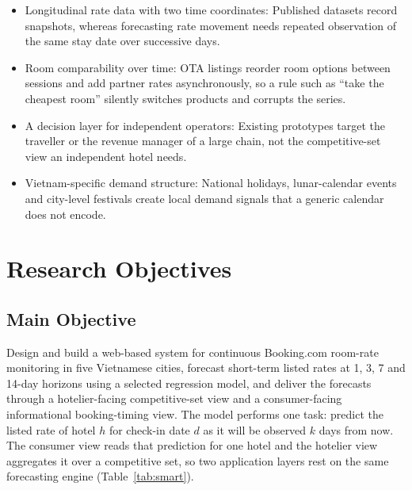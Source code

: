 \begin{itemize}[leftmargin=*, itemsep=1pt, parsep=0pt, topsep=2pt]
    \item Longitudinal rate data with two time coordinates: Published datasets record snapshots, whereas forecasting rate movement needs repeated observation of the same stay date over successive days.
    \item Room comparability over time: OTA listings reorder room options between sessions and add partner rates asynchronously, so a rule such as ``take the cheapest room'' silently switches products and corrupts the series.
    \item A decision layer for independent operators: Existing prototypes target the traveller or the revenue manager of a large chain, not the competitive-set view an independent hotel needs.
    \item Vietnam-specific demand structure: National holidays, lunar-calendar events and city-level festivals create local demand signals that a generic calendar does not encode.
\end{itemize}

\section{Research Objectives}

\subsection{Main Objective}

Design and build a web-based system for continuous Booking.com room-rate monitoring in five Vietnamese cities, forecast short-term listed rates at 1, 3, 7 and 14-day horizons using a selected regression model, and deliver the forecasts through a hotelier-facing competitive-set view and a consumer-facing informational booking-timing view. The model performs one task: predict the listed rate of hotel $h$ for check-in date $d$ as it will be observed $k$ days from now. The consumer view reads that prediction for one hotel and the hotelier view aggregates it over a competitive set, so two application layers rest on the same forecasting engine (Table~\ref{tab:smart}).

